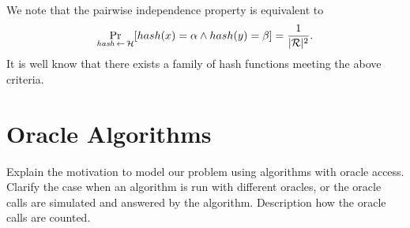 We note that the pairwise independence property is equivalent to
\begin{displaymath}
\underset{\hash \la0 \cH}{\Pr}[hash(x) = \alpha \land hash(y) = \beta] = \frac{1}{|\cR|^2}.
\end{displaymath}
It is well know \cite{Carter:1977:UCH:800105.803400} that there exists a family of hash functions meeting the above criteria.


\section{Oracle Algorithms}
Explain the motivation to model our problem using algorithms with oracle access.
Clarify the case when an algorithm is run with different oracles, or the oracle calls are simulated and answered by the algorithm.
Description how the oracle calls are counted.


